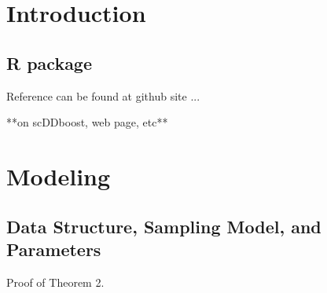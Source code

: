 \documentclass[aoas,preprint]{imsart}
\begin{document}
\clearpage

\section{Introduction}





\subsection{R package}

Reference can be found at github site ...

**on scDDboost, web page, etc**

\section{Modeling}

\subsection{Data Structure, Sampling Model, and Parameters}


Proof of Theorem 2.
\end{document}
